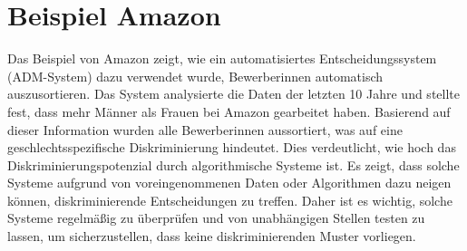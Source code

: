 \documentclass{article}
\begin{document}
\section{Beispiel Amazon}
Das Beispiel von Amazon zeigt, wie ein automatisiertes Entscheidungssystem (ADM-System) dazu verwendet wurde, Bewerberinnen automatisch auszusortieren. Das System analysierte die Daten der letzten 10 Jahre und stellte fest, dass mehr Männer als Frauen bei Amazon gearbeitet haben. Basierend auf dieser Information wurden alle Bewerberinnen aussortiert, was auf eine geschlechtsspezifische Diskriminierung hindeutet. Dies verdeutlicht, wie hoch das Diskriminierungspotenzial durch algorithmische Systeme ist. Es zeigt, dass solche Systeme aufgrund von voreingenommenen Daten oder Algorithmen dazu neigen können, diskriminierende Entscheidungen zu treffen. Daher ist es wichtig, solche Systeme regelmäßig zu überprüfen und von unabhängigen Stellen testen zu lassen, um sicherzustellen, dass keine diskriminierenden Muster vorliegen.

\printbibliography
\end{document}
